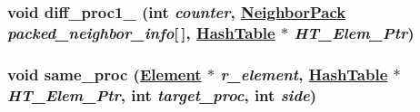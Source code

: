 \hypertarget{update__element__info_8C_a7}{
\subsubsection[diff\_\-proc1\_\-2]{\setlength{\rightskip}{0pt plus 5cm}void diff\_\-proc1\_ (int {\em counter}, \hyperlink{structNeighborPack}{Neighbor\-Pack} {\em packed\_\-neighbor\_\-info}\mbox{[}$\,$\mbox{]}, \hyperlink{classHashTable}{Hash\-Table} $\ast$ {\em HT\_\-Elem\_\-Ptr})}}
\label{update__element__info_8C_a7}


\hypertarget{update__element__info_8C_a0}{
\subsubsection[same\_\-proc]{\setlength{\rightskip}{0pt plus 5cm}void same\_\-proc (\hyperlink{classElement}{Element} $\ast$ {\em r\_\-element}, \hyperlink{classHashTable}{Hash\-Table} $\ast$ {\em HT\_\-Elem\_\-Ptr}, int {\em target\_\-proc}, int {\em side})}}
\label{update__element__info_8C_a0}


